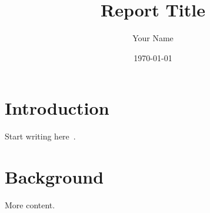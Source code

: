 \documentclass[11pt]{report}
\title{Report Title}
\author{Your Name}
\date{\today}
\begin{document}
\maketitle
\tableofcontents

\chapter{Introduction}
Start writing here~\cite{knuth1984}.

\chapter{Background}
More content.



\end{document}
